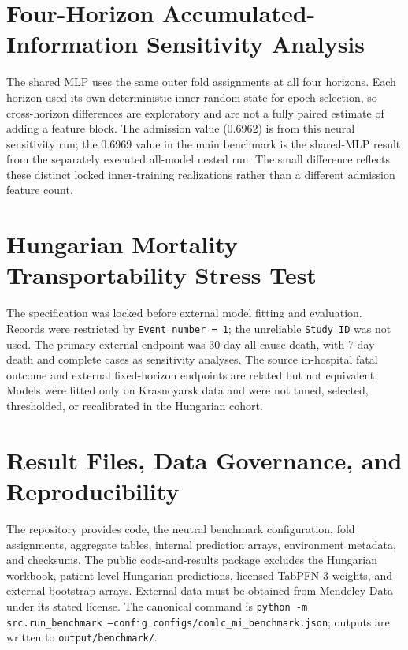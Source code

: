 \section{Four-Horizon Accumulated-Information Sensitivity Analysis}
\label{app:temporal}

The shared MLP uses the same outer fold assignments at all four horizons. Each horizon used its own deterministic inner random state for epoch selection, so cross-horizon differences are exploratory and are not a fully paired estimate of adding a feature block. The admission value (0.6962) is from this neural sensitivity run; the 0.6969 value in the main benchmark is the shared-MLP result from the separately executed all-model nested run. The small difference reflects these distinct locked inner-training realizations rather than a different admission feature count.


\section{Hungarian Mortality Transportability Stress Test}
\label{app:external}

The specification was locked before external model fitting and evaluation. Records were restricted by \texttt{Event number = 1}; the unreliable \texttt{Study ID} was not used. The primary external endpoint was 30-day all-cause death, with 7-day death and complete cases as sensitivity analyses. The source in-hospital fatal outcome and external fixed-horizon endpoints are related but not equivalent. Models were fitted only on Krasnoyarsk data and were not tuned, selected, thresholded, or recalibrated in the Hungarian cohort.






\section{Result Files, Data Governance, and Reproducibility}
\label{app:governance}

The repository provides code, the neutral benchmark configuration, fold assignments, aggregate tables, internal prediction arrays, environment metadata, and checksums. The public code-and-results package excludes the Hungarian workbook, patient-level Hungarian predictions, licensed TabPFN-3 weights, and external bootstrap arrays. External data must be obtained from Mendeley Data under its stated license. The canonical command is \texttt{python -m src.run\_benchmark --config configs/comlc\_mi\_benchmark.json}; outputs are written to \texttt{output/benchmark/}.
